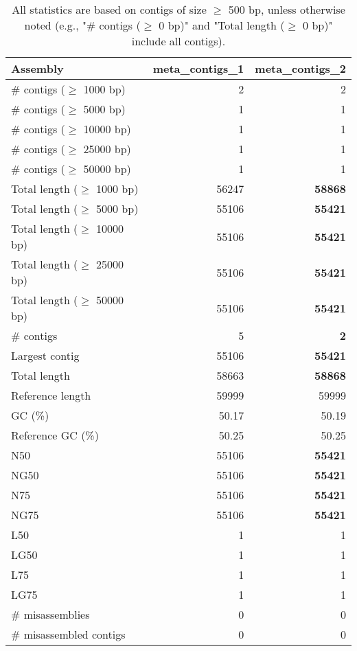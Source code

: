 \documentclass[12pt,a4paper]{article}
\begin{document}
\begin{table}[ht]
\begin{center}
\caption{All statistics are based on contigs of size $\geq$ 500 bp, unless otherwise noted (e.g., "\# contigs ($\geq$ 0 bp)" and "Total length ($\geq$ 0 bp)" include all contigs).}
\begin{tabular}{|l*{2}{|r}|}
\hline
Assembly & meta\_contigs\_1 & meta\_contigs\_2 \\ \hline
\# contigs ($\geq$ 1000 bp) & 2 & 2 \\ \hline
\# contigs ($\geq$ 5000 bp) & 1 & 1 \\ \hline
\# contigs ($\geq$ 10000 bp) & 1 & 1 \\ \hline
\# contigs ($\geq$ 25000 bp) & 1 & 1 \\ \hline
\# contigs ($\geq$ 50000 bp) & 1 & 1 \\ \hline
Total length ($\geq$ 1000 bp) & 56247 & {\bf 58868} \\ \hline
Total length ($\geq$ 5000 bp) & 55106 & {\bf 55421} \\ \hline
Total length ($\geq$ 10000 bp) & 55106 & {\bf 55421} \\ \hline
Total length ($\geq$ 25000 bp) & 55106 & {\bf 55421} \\ \hline
Total length ($\geq$ 50000 bp) & 55106 & {\bf 55421} \\ \hline
\# contigs & 5 & {\bf 2} \\ \hline
Largest contig & 55106 & {\bf 55421} \\ \hline
Total length & 58663 & {\bf 58868} \\ \hline
Reference length & 59999 & 59999 \\ \hline
GC (\%) & 50.17 & 50.19 \\ \hline
Reference GC (\%) & 50.25 & 50.25 \\ \hline
N50 & 55106 & {\bf 55421} \\ \hline
NG50 & 55106 & {\bf 55421} \\ \hline
N75 & 55106 & {\bf 55421} \\ \hline
NG75 & 55106 & {\bf 55421} \\ \hline
L50 & 1 & 1 \\ \hline
LG50 & 1 & 1 \\ \hline
L75 & 1 & 1 \\ \hline
LG75 & 1 & 1 \\ \hline
\# misassemblies & 0 & 0 \\ \hline
\# misassembled contigs & 0 & 0 \\ \hline

\end{tabular}
\end{center}
\end{table}
\end{document}
